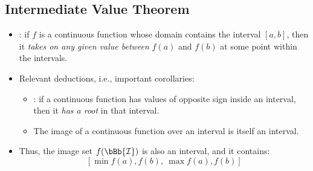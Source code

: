 \begin{itemize}
  \subsection{Intermediate Value Theorem}
  \begin{itemize}
    \item {}: if \(f\) is a continuous function whose domain contains the interval \([a,b]\), then it \emph{takes on any given value between} \(f(a)\) and \(f(b)\) at some point within the intervals.
    \item Relevant deductions, i.e., important corollaries:
      \begin{itemize}
        \item {}: if a continuous function has values of opposite sign inside an interval, then it \emph{has a root} in that interval.
        \item The image of a continuous function over an interval is itself an interval. 
      \end{itemize}
    \item Thus, the image set \(f(\bBb{\mathcal{I}})\)  is also an interval, and it contains: 
    \[%
    \left[
      \min{f(a),f(b)},~
      \max{f(a),f(b)}
    \right]
    \]%
  \end{itemize}
\end{itemize}

